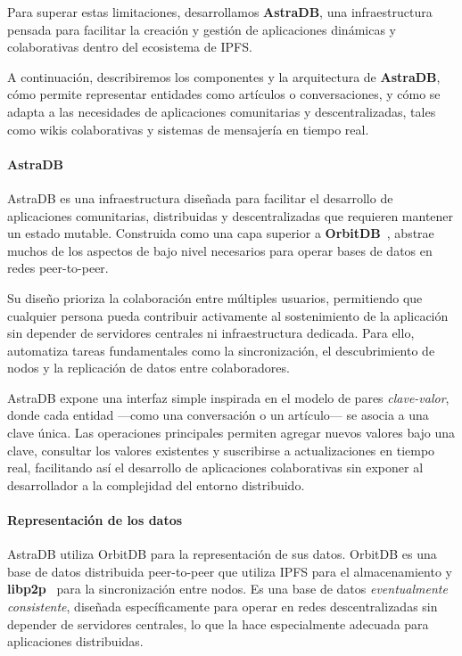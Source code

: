 Para superar estas limitaciones, desarrollamos \textbf{AstraDB}, una infraestructura pensada para facilitar la creación y gestión de aplicaciones dinámicas y colaborativas dentro del ecosistema de IPFS.

A continuación, describiremos los componentes y la arquitectura de \textbf{AstraDB}, cómo permite representar entidades como artículos o conversaciones, y cómo se adapta a las necesidades de aplicaciones comunitarias y descentralizadas, tales como wikis colaborativas y sistemas de mensajería en tiempo real.

\paragraph{AstraDB}

AstraDB es una infraestructura diseñada para facilitar el desarrollo de aplicaciones comunitarias, distribuidas y descentralizadas que requieren mantener un estado mutable. Construida como una capa superior a \textbf{OrbitDB}~\cite{orbitdb}, abstrae muchos de los aspectos de bajo nivel necesarios para operar bases de datos en redes peer-to-peer.

Su diseño prioriza la colaboración entre múltiples usuarios, permitiendo que cualquier persona pueda contribuir activamente al sostenimiento de la aplicación sin depender de servidores centrales ni infraestructura dedicada. Para ello, automatiza tareas fundamentales como la sincronización, el descubrimiento de nodos y la replicación de datos entre colaboradores.

AstraDB expone una interfaz simple inspirada en el modelo de pares \textit{clave-valor}, donde cada entidad —como una conversación o un artículo— se asocia a una clave única. Las operaciones principales permiten agregar nuevos valores bajo una clave, consultar los valores existentes y suscribirse a actualizaciones en tiempo real, facilitando así el desarrollo de aplicaciones colaborativas sin exponer al desarrollador a la complejidad del entorno distribuido.

\paragraph{Representación de los datos}

AstraDB utiliza OrbitDB para la representación de sus datos. OrbitDB es una base de datos distribuida peer-to-peer que utiliza IPFS para el almacenamiento y \textbf{libp2p}~\cite{libp2p} para la sincronización entre nodos. Es una base de datos \textit{eventualmente consistente}, diseñada específicamente para operar en redes descentralizadas sin depender de servidores centrales, lo que la hace especialmente adecuada para aplicaciones distribuidas.

